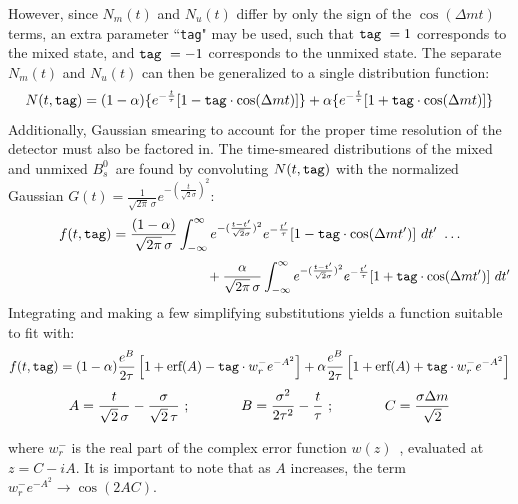 \documentclass[10pt]{article}
\newcommand{\Bs}{\mbox{$B_{s}^{0}$}}
\newcommand{\Tag}{\mbox{\tt tag}}
\newcommand{\erf}{\mbox{erf}}
\begin{document}
\noindent However, since $N_{m}(t)$ and $N_{u}(t)$ differ by only
the sign of  the $\cos(\Delta m t)$ terms, an extra parameter
``\Tag" may be used, such that $\Tag\ =1$ corresponds to the mixed
state, and  $\Tag\ =-1$ corresponds to the unmixed state. The
separate $N_{m}(t)$ and $N_{u}(t)$ can then be generalized to a
single distribution function:
\begin{equation}
        N(t,\Tag) = (1-\alpha)\{e^{-\frac{t}{\tau}}[ 1 -\Tag\cdot \cos(\Delta m t) ]\}
    + \alpha\{e^{-\frac{t}{\tau}}[ 1 + \Tag\cdot \cos (\Delta m t) ]\}
\end{equation}
Additionally, Gaussian smearing to account for the proper time
resolution of the detector must also be factored in. The
time-smeared distributions of the mixed and unmixed \Bs\ are found
by convoluting $N(t,\Tag)$ with the normalized Gaussian
$G(t)=\frac{1}{\sqrt{2\pi}\,\sigma}e^{-(\frac{t}{\sqrt{2}\sigma})^2}$:
\begin{displaymath}
        f(t,\Tag) =
     \frac{(1-\alpha)}{\sqrt{2\pi}\,\sigma}
     \int_{-\infty}^{\infty}e^{-(\frac{t-t'}{\sqrt{2}\sigma})^2}
    e^{-\frac{t'}{\tau}}[ 1 -\Tag\cdot \cos(\Delta m t')]\,\,dt'\,\, \ldots
\end{displaymath}
\begin{displaymath}
    \mbox{\hspace{2in}} \,\, + \frac{\alpha}{\sqrt{2\pi}\,\sigma}
    \int_{-\infty}^{\infty}e^{-(\frac{t-t'}{\sqrt{2}\sigma})^2}
    e^{-\frac{t'}{\tau}}[ 1 +\Tag\cdot \cos(\Delta m t')]\,\,dt'
\end{displaymath}
Integrating and making a few simplifying substitutions yields a function suitable to fit with:
\begin{equation}
\label{fitfunc}
    f(t,\Tag) = (1-\alpha)\frac{e^B}{2\tau}\left[1+\erf(A)-\mbox{\tt tag}\cdot w_r^-e^{-A^2}\right]
        + \alpha\frac{e^B}{2\tau}\left[1+\erf(A)+\mbox{\tt tag}\cdot w_r^-e^{-A^2}\right]
\end{equation}
\[
    A=\frac{t}{\sqrt{2}\,\sigma}-\frac{\sigma}{\sqrt{2}\,\tau}\,\,; \mbox{\hspace{0.5in}}
    B=\frac{\sigma^2}{2\tau^2}-\frac{t}{\tau}\,\,; \mbox{\hspace{0.5in}}
    C=\frac{\sigma \Delta m}{\sqrt{2}}
\]

\noindent where $w_r^-$ is the real part of the complex error
function $w(z)$~\cite{cwerf}, evaluated at $z = C - iA$. It is
important to note that as $A$ increases, the term $w_r^-e^{-A^2}
\rightarrow \cos(2AC)$. \\
\end{document}
